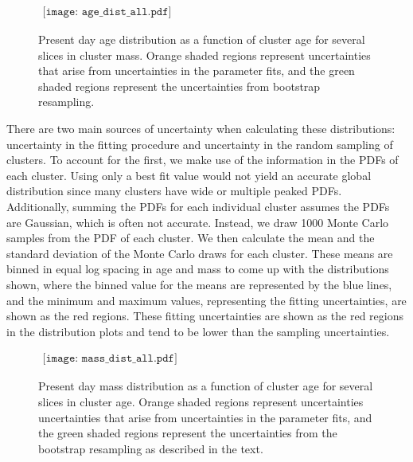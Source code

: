 \documentclass{emulateapj}
\begin{document}
\begin{figure*}[!htbp]
   \begin{center}$
      \begin{array}{cc}
         \texttt{[image: age\_dist\_all.pdf]} 
      \end{array}$
   \end{center}
  \caption{Present day age distribution as a function of cluster age for several slices in cluster mass.  Orange shaded regions represent uncertainties that arise from uncertainties in the parameter fits, and the green shaded regions represent the uncertainties from bootstrap resampling.}
  \label{fig:agedist}
\end{figure*}

There are two main sources of uncertainty when calculating these distributions:  uncertainty in the fitting procedure and uncertainty in the random sampling of clusters.  To account for the first, we make use of the information in the PDFs of each cluster.  Using only a best fit value would not yield an accurate global distribution since many clusters have wide or multiple peaked PDFs.  Additionally, summing the PDFs for each individual cluster assumes the PDFs are Gaussian, which is often not accurate.  Instead, we draw 1000 Monte Carlo samples from the PDF of each cluster.  We then calculate the mean and the standard deviation of the Monte Carlo draws for each cluster.  These means are binned in equal log spacing in age and mass to come up with the distributions shown, where the binned value for the means are represented by the blue lines, and the minimum and maximum values, representing the fitting uncertainties, are shown as the red regions.  These fitting uncertainties are shown as the red regions in the distribution plots and tend to be lower than the sampling uncertainties.  

\begin{figure*}[!htbp]
   \begin{center}$
      \begin{array}{cc}
         \texttt{[image: mass\_dist\_all.pdf]} 
      \end{array}$
   \end{center}
  \caption{Present day mass distribution as a function of cluster age for several slices in cluster age.  Orange shaded regions represent uncertainties uncertainties that arise from uncertainties in the parameter fits, and the green shaded regions represent the uncertainties from the bootstrap resampling as described in the text.}
  \label{fig:massdist}
\end{figure*}
\end{document}
